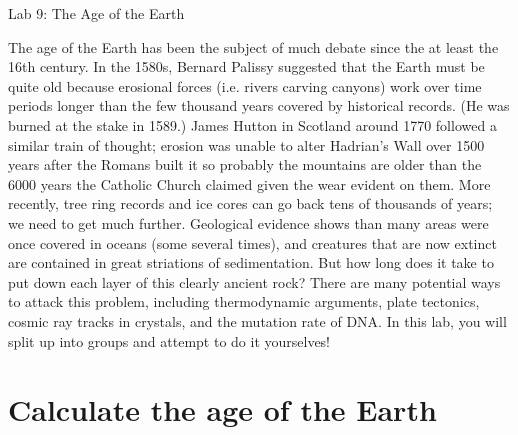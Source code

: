 \documentclass[12pt]{article}%
\begin{document}
\begin{center}
    \LARGE Lab 9: The Age of the Earth
\end{center}

The age of the Earth has been the subject of much debate since the at least the 16th century. 
In the 1580s, Bernard Palissy suggested that the Earth must be quite old because erosional forces (i.e. rivers carving canyons) work over time periods longer than the few thousand years covered by historical records. 
(He was burned at the stake in 1589.)
James Hutton in Scotland around 1770 followed a similar train of thought; erosion was unable to alter Hadrian's Wall over 1500 years after the Romans built it so probably the mountains are older than the 6000 years the Catholic Church claimed given the wear evident on them. 
More recently, tree ring records and ice cores can go back tens of thousands of years; we need to get much further.  
Geological evidence shows than many areas were once covered in oceans (some several times), and creatures that are now extinct are contained in great striations of sedimentation.
But how long does it take to put down each layer of this clearly ancient rock? 
There are many potential ways to attack this problem, including thermodynamic arguments, plate tectonics, cosmic ray tracks in crystals, and the mutation rate of DNA. In this lab, you will split up into groups and attempt to do it yourselves!


\section{Calculate the age of the Earth}
\end{document}
